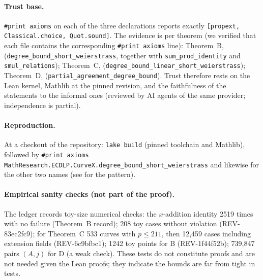 \documentclass[11pt,a4paper]{article}
\theoremstyle{remark}
\begin{document}
\paragraph{Trust base.} \texttt{\#print axioms} on each of the three declarations reports exactly \texttt{[propext, Classical.choice, Quot.sound]}.
The evidence is per theorem (we verified that each file contains the corresponding \texttt{\#print axioms} line):
Theorem~B, 
(\texttt{degree\_bound\_short\_weierstrass}, together with \texttt{sum\_prod\_identity} and \texttt{smul\_relations});
Theorem~C, 
(\texttt{degree\_bound\_linear\_short\_weierstrass});
Theorem~D, 
(\texttt{partial\_agreement\_degree\_bound}).
Trust therefore rests on the Lean kernel, Mathlib at the pinned revision, and the faithfulness of the statements to the informal ones (reviewed by AI agents of the same provider; independence is partial).

\paragraph{Reproduction.} At a checkout of the repository: \texttt{lake build} (pinned toolchain and Mathlib), followed by
\verb|#print axioms MathResearch.ECDLP.CurveX.degree_bound_short_weierstrass| and likewise for the other two names
(see  for the pattern).


\paragraph{Empirical sanity checks (not part of the proof).} The ledger records toy-size numerical checks: the $x$-addition identity 2519 times with no failure
(Theorem~B record); 208 toy cases without violation (\mbox{REV-83ec2fc9}); for Theorem~C 533 curves with $p\le211$, then 12{,}459 cases including extension fields (\mbox{REV-6c9bfbc1});
1242 toy points for B (\mbox{REV-1f44f52b}); 739{,}847 pairs $(A,j)$ for D (a weak check). These tests do not constitute proofs and are not needed given the Lean proofs; they
indicate the bounds are far from tight in tests.

\endgroup
\end{document}
